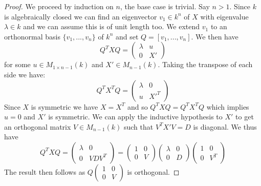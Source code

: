 \documentclass[12pt]{article}
\theoremstyle{plain}
\theoremstyle{definition}
\begin{document}
	\begin{proof}
		We proceed by induction on $n$, the base case is trivial. Say $n > 1$. Since $k$ is algebraically closed we can find an eigenvector $v_1 \in k^n$ of $X$ with eigenvalue $\lambda \in k$ and we can assume this is of unit length too. We extend $v_1$ to an orthonormal basis $\lbrace v_1,...,v_n\rbrace$ of $k^n$ and set $Q = [v_1,...,v_n]$. We then have
		\[Q^TXQ = \begin{pmatrix}
			\lambda & u\\
			0 & X'
		\end{pmatrix}\]
		for some $u \in M_{1 \times n-1}(k)$ and $X' \in M_{n-1}(k)$. Taking the transpose of each side we have:
		\[Q^TX^TQ = \begin{pmatrix}
			\lambda & 0\\
			u & X'^T
		\end{pmatrix} \]
		Since $X$ is symmetric we have $X = X^T$ and so $Q^TXQ = Q^TX^TQ$ which implies $u = 0$ and $X'$ is symmetric. We can apply the inductive hypothesis to $X'$ to get an orthogonal matrix $V \in M_{n-1}(k)$ such that $V^TX'V = D$ is diagonal. We thus have
		\[Q^TXQ = \begin{pmatrix}
			\lambda & 0\\
			0 & VDV^T
		\end{pmatrix} = \begin{pmatrix}
			1 & 0\\
			0 & V
		\end{pmatrix}\begin{pmatrix}
			\lambda & 0\\
			0 & D
		\end{pmatrix}\begin{pmatrix}
			1 & 0\\
			0 & V^T
		\end{pmatrix}\]The result then follows as $Q\begin{pmatrix}
			1 & 0\\
			0 & V
		\end{pmatrix}$ is orthogonal.
	\end{proof}
	
\end{document}
